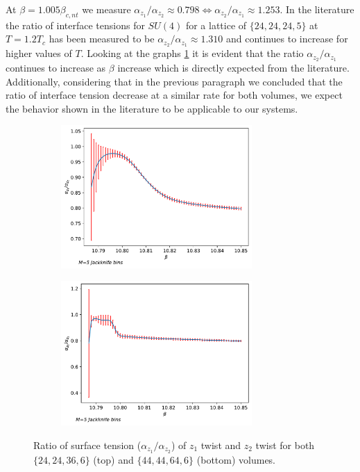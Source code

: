 \documentclass[english,twoside,openright]{UH_TCM_MSc}
\begin{document}
At $\beta = 1.005 \beta_{c,nt}$ we measure $\alpha_{z_1}/\alpha_{z_2}\approx 0.798 \iff \alpha_{z_2}/\alpha_{z_1} \approx 1.253$. In the literature \cite{DEFORCRAND2005647} the ratio of interface tensions for $SU(4)$ for a lattice of $\{24,24,24,5\}$ at $T = 1.2 T_c$ has been measured to be $\alpha_{z_2}/\alpha_{z_1}\approx 1.310$ and continues to increase for higher values of $T$. Looking at the graphs \ref{fig:tension_ratio} it is evident that the ratio $\alpha_{z_2}/\alpha_{z_1}$ continues to increase as $\beta$ increase which is directly expected from the literature. Additionally, considering that in the previous paragraph we concluded that the ratio of interface tension decrease at a similar rate for both volumes, we expect the behavior shown in the literature to be applicable to our systems. 
\begin{figure}[htb]
    \centering
    \begin{subfigure}[t]{\textwidth}
        \centering
        \includegraphics[width=0.8\textwidth]{final_plots/misc/ratio_24_24_36_6.pdf}
    \end{subfigure}
    \begin{subfigure}[t]{\textwidth}
        \centering
        \includegraphics[width=0.8\textwidth]{final_plots/misc/ratio_44_44_64_6.pdf}
    \end{subfigure}
    \caption{Ratio of surface tension ($\alpha_{z_1}/\alpha_{z_2}$) of $z_1$ twist and $z_2$ twist for both $\{24,24,36,6\}$ (top) and $\{44,44,64,6\}$ (bottom) volumes.} 
    \label{fig:tension_ratio}
\end{figure}
\end{document}

